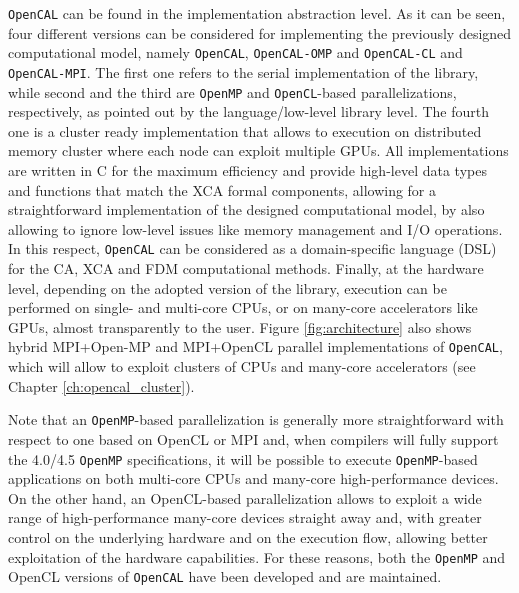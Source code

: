 \texttt{OpenCAL} can be found in the implementation abstraction level. As it
can be seen, four different versions can be considered for
implementing the previously designed computational model, namely
\texttt{OpenCAL}, \texttt{OpenCAL-OMP} and \texttt{OpenCAL-CL} and \texttt{OpenCAL-MPI}. The first one refers to the  serial implementation of the library, while second and the third are \texttt{OpenMP}  and \texttt{OpenCL}-based parallelizations, respectively, as pointed out by
the language/low-level library level. The fourth one is a cluster ready implementation that allows to execution on distributed memory cluster where each node can exploit multiple GPUs. All implementations are written in C for the maximum efficiency and provide high-level data types and functions that match the XCA formal components, allowing  for a straightforward implementation of the designed computational  model, by also allowing to ignore low-level issues like memory  management and I/O operations. In this respect, \texttt{OpenCAL} can be  considered as a domain-specific language (DSL) for the CA, XCA and  FDM computational methods. Finally, at the hardware level, depending  on the adopted version of the library, execution can be performed on  single- and multi-core CPUs, or on many-core accelerators like GPUs,  almost transparently to the user. Figure \ref{fig:architecture} also shows hybrid MPI+Open-MP and MPI+OpenCL parallel implementations of \texttt{OpenCAL}, which will allow to exploit clusters of CPUs and many-core accelerators (see Chapter \ref{ch:opencal_cluster}). 

Note that an \texttt{OpenMP}-based parallelization is generally more
straightforward with respect to one based on OpenCL or MPI and, when
compilers will fully support the 4.0/4.5 \texttt{OpenMP} specifications, it
will be possible to execute \texttt{OpenMP}-based applications on both
multi-core CPUs and many-core high-performance devices. On the other
hand, an OpenCL-based parallelization allows to exploit a wide range
of high-performance many-core devices straight away and, with greater control on the underlying hardware and on the execution flow, allowing better exploitation of the hardware capabilities. 
 For these reasons, both the \texttt{OpenMP} and OpenCL versions of \texttt{OpenCAL} have been developed and are maintained. 


